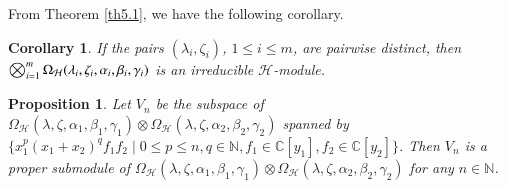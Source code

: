 \documentclass[12pt,reqno]{amsart}
\def\N{\mathbb{N}}
\def\C{\mathbb{C}}
\numberwithin{equation}{section}
\newtheorem{coro}[theo]{Corollary}
\newtheorem{prop}[theo]{Proposition}
\begin{document}
From Theorem \ref{th5.1}, we have the following corollary.
\begin{coro}
If  the pairs $(\lambda_i,\zeta_i)$, $1\le i \le m$, are pairwise distinct, then $\bigotimes_{i=1}^{m}\Omega_{\mathcal{H}}(\lambda_i,\zeta_i, \alpha_i,\beta_i,\linebreak\gamma_i)$ is an irreducible $\mathcal{H}$-module.
\end{coro}



\begin{prop}\label{theo5.2}
    Let $V_n$ be the subspace of $\Omega_{\mathcal{H}}(\lambda, \zeta,\alpha_1,\beta_1,\gamma_1)\otimes\Omega_{\mathcal{H}}(\lambda,\zeta, \alpha_2,\beta_2,\gamma_2)$ spanned by $\{x_1^p(x_1+x_2)^qf_1f_2\mid 0\le p\le n, q\in\N,f_1\in\C[y_1],f_2\in\C[y_2]\}$. Then $V_n$ is a proper submodule of $\Omega_{\mathcal{H}}(\lambda, \zeta,\alpha_1,\beta_1,\gamma_1)\otimes\Omega_{\mathcal{H}}(\lambda, \zeta,\alpha_2,\beta_2,\gamma_2)$ for any $n\in\N$.
\end{prop}
\end{document}
